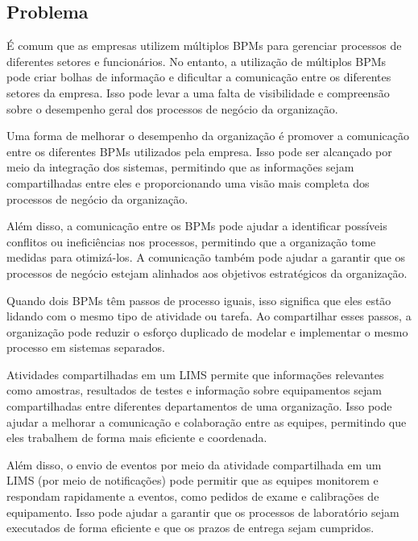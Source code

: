 \subsection{Problema}

É comum que as empresas utilizem múltiplos BPMs para gerenciar processos de diferentes setores e funcionários.
No entanto, a utilização de múltiplos BPMs pode criar bolhas de informação e dificultar a comunicação entre os diferentes setores da empresa. Isso pode levar a uma falta de visibilidade e compreensão sobre o desempenho geral dos processos de negócio da organização.

Uma forma de melhorar o desempenho da organização é promover a comunicação entre os diferentes BPMs utilizados pela empresa. Isso pode ser alcançado por meio da integração dos sistemas, permitindo que as informações sejam compartilhadas entre eles e proporcionando uma visão mais completa dos processos de negócio da organização.

Além disso, a comunicação entre os BPMs pode ajudar a identificar possíveis conflitos ou ineficiências nos processos, permitindo que a organização tome medidas para otimizá-los. A comunicação também pode ajudar a garantir que os processos de negócio estejam alinhados aos objetivos estratégicos da organização.

Quando dois BPMs têm passos de processo iguais, isso significa que eles estão lidando com o mesmo tipo de atividade ou tarefa. Ao compartilhar esses passos, a organização pode reduzir o esforço duplicado de modelar e implementar o mesmo processo em sistemas separados.

Atividades compartilhadas em um LIMS permite que informações relevantes como amostras, resultados de testes e informação sobre equipamentos sejam compartilhadas entre diferentes departamentos de uma organização. Isso pode ajudar a melhorar a comunicação e colaboração entre as equipes, permitindo que eles trabalhem de forma mais eficiente e coordenada.

Além disso, o envio de eventos por meio da atividade compartilhada em um LIMS (por meio de notificações) pode permitir que as equipes monitorem e respondam rapidamente a eventos, como pedidos de exame e calibrações de equipamento. Isso pode ajudar a garantir que os processos de laboratório sejam executados de forma eficiente e que os prazos de entrega sejam cumpridos.